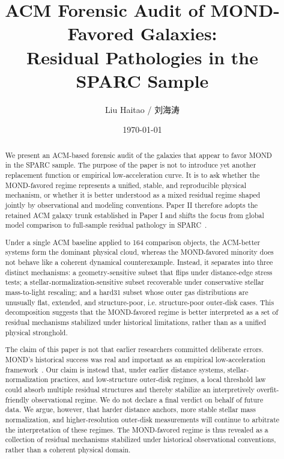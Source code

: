 ﻿\documentclass[aps,prd,twocolumn,superscriptaddress,longbibliography,nofootinbib,floatfix,10pt]{revtex4-2}
\newcommand{\zhname}{{\zhnamefont 刘海涛}}
\newcommand{\zhname}{刘海涛}
\begin{document}
\title{ACM Forensic Audit of MOND-Favored Galaxies:\\Residual Pathologies in the SPARC Sample}

\author{Liu Haitao / \zhname}

\date{\today}

\begin{abstract}
We present an ACM-based forensic audit of the galaxies that appear to favor
MOND in the SPARC sample. The purpose of the paper is not to introduce yet
another replacement function or empirical low-acceleration curve. It is to ask
whether the MOND-favored regime represents a unified, stable, and reproducible
physical mechanism, or whether it is better understood as a mixed residual
regime shaped jointly by observational and modeling conventions. Paper II
therefore adopts the retained ACM galaxy trunk established in Paper I and
shifts the focus from global model comparison to full-sample residual
pathology in SPARC~\cite{LelliMcGaughSchombert2016SPARC}.

Under a single ACM baseline applied to 164 comparison objects, the ACM-better
systems form the dominant physical cloud, whereas the MOND-favored minority
does not behave like a coherent dynamical counterexample. Instead, it separates
into three distinct mechanisms: a geometry-sensitive subset that flips under
distance-edge stress tests; a stellar-normalization-sensitive subset recoverable
under conservative stellar mass-to-light rescaling; and a hard31 subset whose
outer gas distributions are unusually flat, extended, and structure-poor, i.e.
structure-poor outer-disk cases. This
decomposition suggests that the MOND-favored regime is better interpreted as a
set of residual mechanisms stabilized under historical limitations, rather than
as a unified physical stronghold.

The claim of this paper is not that earlier researchers committed deliberate
errors. MOND's historical success was real and important as an empirical
low-acceleration framework~\cite{Milgrom1983MOND,FamaeyMcGaugh2012}. Our claim is
instead that, under earlier distance systems, stellar-normalization practices,
and low-structure outer-disk regimes, a local threshold law could absorb
multiple residual structures and thereby stabilize an interpretively
overfit-friendly observational regime. We do not declare a final verdict on
behalf of future data. We argue, however, that harder distance anchors, more stable stellar
mass normalization, and higher-resolution outer-disk measurements will
continue to arbitrate the interpretation of these regimes. The MOND-favored
regime is thus revealed as a collection of residual mechanisms stabilized under
historical observational conventions, rather than a coherent physical domain.
\end{abstract}
\end{document}
